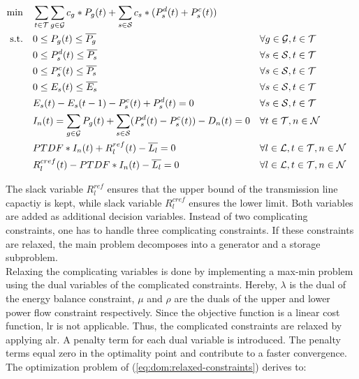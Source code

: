 \begin{subequations}
	\begin{align}
		 \min \quad & \sum_{t\in\mathcal{T}}\sum_{g\in\mathcal{G}}c_g*P_g(t) + \sum_{s\in\mathcal{S}}c_s*(P_s^d(t)+P_s^c(t)) \label{eq:dom:relaxed-constraints}\\
		 \text{s.t.} \quad & 0 \leq P_g(t) \leq \overline{P_g} && \forall g \in \mathcal{G}, t \in \mathcal{T} \\
		 & 0 \leq P_s^d(t) \leq \overline{P_s} && \forall s \in \mathcal{S}, t \in \mathcal{T} \\
		 & 0 \leq P_s^c(t) \leq \overline{P_s} && \forall s \in \mathcal{S}, t \in \mathcal{T} \\
		 & 0 \leq E_s(t) \leq \overline{E_s} && \forall s \in \mathcal{S}, t \in \mathcal{T} \\
		 & E_s(t) - E_s(t-1) - P_s^c(t) + P_s^d(t) = 0 && \forall s \in \mathcal{S}, t \in \mathcal{T} \\
		 & I_n(t) = \sum_{g\in\mathcal{G}}P_g(t) + \sum_{s\in\mathcal{S}}(P_s^d(t)-P_s^c(t))-D_n(t) = 0 && \forall t \in \mathcal{T}, n \in \mathcal{N} \label{eq:dom:injection-term} \\
		 & PTDF * I_n(t) + R^{ref}_l(t) - \overline{L_l} = 0 && \forall l \in \mathcal{L}, t \in \mathcal{T}, n \in \mathcal{N} \label{eq:dom:con:pf-upper} \\
		 & R^{cref}_l(t) - PTDF * I_n(t) - \overline{L_l} = 0 && \forall l \in \mathcal{L}, t \in \mathcal{T}, n \in \mathcal{N} \label{eq:dom:con:pf-lower}
	\end{align}
\end{subequations}

The slack variable $R_l^{ref}$ ensures that the upper bound of the transmission line capactiy is kept, while slack variable $R_l^{cref}$ ensures the lower limit. Both variables are added as additional decision variables. Instead of two complicating constraints, one has to handle three complicating constraints. If these constraints are relaxed, the main problem decomposes into a generator and a storage subproblem.\\

Relaxing the complicating variables is done by implementing a max-min problem using the dual variables of the complicated constraints. Hereby, $\lambda$ is the dual of the energy balance constraint, $\mu$ and $\rho$ are the duals of the upper and lower power flow constraint respectively. Since the objective function is a linear cost function, \gls{lr} is not applicable. Thus, the complicated constraints are relaxed by applying \gls{alr}. A penalty term for each dual variable is introduced. The penalty terms equal zero in the optimality point and contribute to a faster convergence. The optimization problem of (\ref{eq:dom:relaxed-constraints}) derives to:

